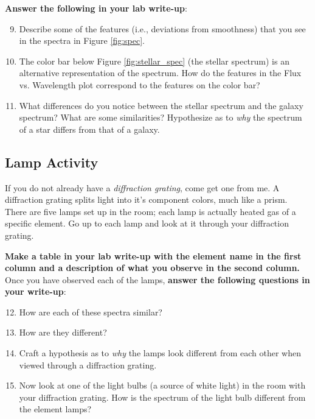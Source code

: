 \documentclass[11pt]{article}
\begin{document}
\medskip
\textbf{Answer the following in your lab write-up}:
\begin{enumerate}
    \setcounter{enumi}{8}
    
    \item Describe some of the features (i.e., deviations from smoothness) that you see in the spectra in Figure \ref{fig:spec}.
    \item The color bar below Figure \ref{fig:stellar_spec} (the stellar spectrum) is an alternative representation of the spectrum. How do the features in the Flux vs. Wavelength plot correspond to the features on the color bar?
    \item What differences do you notice between the stellar spectrum and the galaxy spectrum? What are some similarities? Hypothesize as to \emph{why} the spectrum of a star differs from that of a galaxy.
\end{enumerate}

\subsection{Lamp Activity}

If you do not already have a \emph{diffraction grating}, come get one from me. A diffraction grating splits light into it's component colors, much like a prism. There are five lamps set up in the room; each lamp is actually heated gas of a specific element. Go up to each lamp and look at it through your diffraction grating.  
\bigskip 

\textbf{Make a table in your lab write-up with the element name in the first column and a description of what you observe in the second column.}  Once you have observed each of the lamps, \textbf{answer the following questions in your write-up}:
\begin{enumerate}
    \setcounter{enumi}{11}
    \item How are each of these spectra similar?
    \item How are they different?
    \item Craft a hypothesis as to \textit{why} the lamps look different from each other when viewed through a diffraction grating.
    \item Now look at one of the light bulbs (a source of white light) in the room with your diffraction grating. How is the spectrum of the light bulb different from the element lamps?
\end{enumerate}
\end{document}
